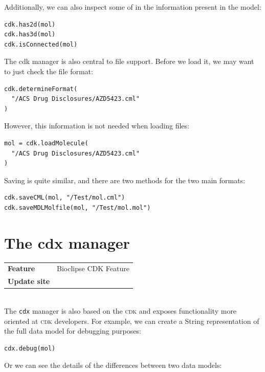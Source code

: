 \documentclass{book}
\begin{document}
\begin{refsection}
Additionally, we can also inspect some of in the information present
in the model:

\begin{Verbatim}
cdk.has2d(mol)
cdk.has3d(mol)
cdk.isConnected(mol)
\end{Verbatim}

The cdk manager is also central to file support. Before we load it, we
may want to just check the file format:

\begin{Verbatim}
cdk.determineFormat(
  "/ACS Drug Disclosures/AZD5423.cml"
)
\end{Verbatim}

However, this information is not needed when loading files:

\begin{Verbatim}
mol = cdk.loadMolecule(
  "/ACS Drug Disclosures/AZD5423.cml"
)
\end{Verbatim}

Saving is quite similar, and there are two methods for the two main
formats:

\begin{Verbatim}
cdk.saveCML(mol, "/Test/mol.cml")
cdk.saveMDLMolfile(mol, "/Test/mol.mol")
\end{Verbatim}

\section{The cdx manager}


\begin{tabular}{ll}
\textbf{Feature} & Bioclipse CDK Feature \\
\textbf{Update site} & \url{} \\
\end{tabular} \\

The \texttt{cdx} manager is also based on the \textsc{cdk} and exposes functionality
more oriented at \textsc{cdk} developers. For example, we can create a String
representation of the full data model for debugging
purposes:

\begin{Verbatim}
cdx.debug(mol)
\end{Verbatim}

Or we can see the details of the differences between two data
models:


\end{refsection}
\end{document}
